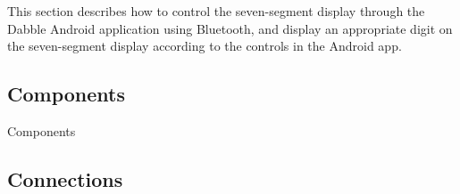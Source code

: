 This section describes how to control the seven-segment display through the
Dabble Android application using Bluetooth, and display an appropriate digit on 
the seven-segment display according to the controls in the Android app.

\subsection{Components}

\begin{table}[!ht]
\centering

\caption{Components}
\label{table:ble-components}
\end{table}
\subsection{Connections}
